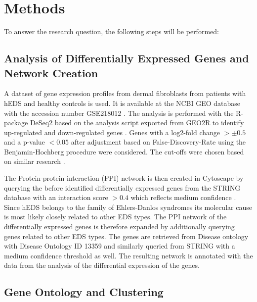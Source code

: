 \section{Methods}
To answer the research question, the following steps will be performed:

\subsection{Analysis of Differentially Expressed Genes and Network Creation}\label{sec:methods-deg}
A dataset of gene expression profiles from dermal fibroblasts from patients with hEDS and healthy controls is used. It is available at the NCBI GEO database with the accession number GSE218012 \cite{Ritelli2020}. The analysis is performed with the R-package DeSeq2 based on the analysis script exported from GEO2R to identify up-regulated and down-regulated genes \cite{DESeq2}. Genes with a log2-fold change $> \pm 0.5$ and a p-value $< 0.05$ after adjustment based on False-Discovery-Rate using the Benjamin-Hochberg procedure were considered. The cut-offs were chosen based on similar research \cite{Karimizadeh2019, Lim2019}.

The Protein-protein interaction (PPI) network is then created in Cytoscape \cite{Cytoscape} by querying the before identified differentially expressed genes from the STRING database with an interaction score $> 0.4$ which reflects medium confidence \cite{StringDB}. Since hEDS belongs to the family of Ehlers-Danlos syndromes its molecular cause is most likely closely related to other EDS types. The PPI network of the differentially expressed genes is therefore expanded by additionally querying genes related to other EDS types. The genes are retrieved from Disease ontology with Disease Ontology ID 13359 \cite{DO} and similarly queried from STRING with a medium confidence threshold as well. The resulting network is annotated with the data from the analysis of the differential expression of the genes.


\subsection{Gene Ontology and Clustering}

